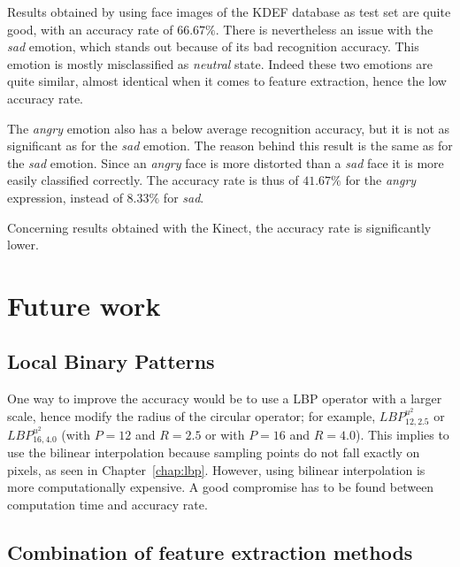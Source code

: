 \noindent Results obtained by using face images of the KDEF database as test set are quite good, with an accuracy rate of $ 66.67\% $. There is nevertheless an issue with the \textit{sad} emotion, which stands out because of its bad recognition accuracy. This emotion is mostly misclassified as \textit{neutral} state. Indeed these two emotions are quite similar, almost identical when it comes to feature extraction, hence the low accuracy rate.
\newline

\noindent The \textit{angry} emotion also has a below average recognition accuracy, but it is not as significant as for the \textit{sad} emotion. The reason behind this result is the same as for the \textit{sad} emotion. Since an \textit{angry} face is more distorted than a \textit{sad} face it is more easily classified correctly. The accuracy rate is thus of $ 41.67\% $ for the \textit{angry} expression,  instead of $ 8.33\% $ for \textit{sad}.
\newline

\noindent Concerning results obtained with the Kinect, the accuracy rate is significantly lower.
\newline

\section{Future work}

\subsection{Local Binary Patterns}

\vspace{\baselineskip}
\noindent One way to improve the accuracy would be to use a LBP operator with a larger scale, hence modify the radius of the circular operator; for example, $ LBP_{12,2.5}^{u^2} $ or $ LBP_{16,4.0}^{u^2} $ (with $ P = 12 $ and $ R = 2.5 $ or with $ P = 16 $ and $ R = 4.0 $). This implies to use the bilinear interpolation because sampling points do not fall exactly on pixels, as seen in Chapter~\ref{chap:lbp}. However, using bilinear interpolation is more computationally expensive. A good compromise has to be found between computation time and accuracy rate.
\newline

\subsection{Combination of feature extraction methods}

